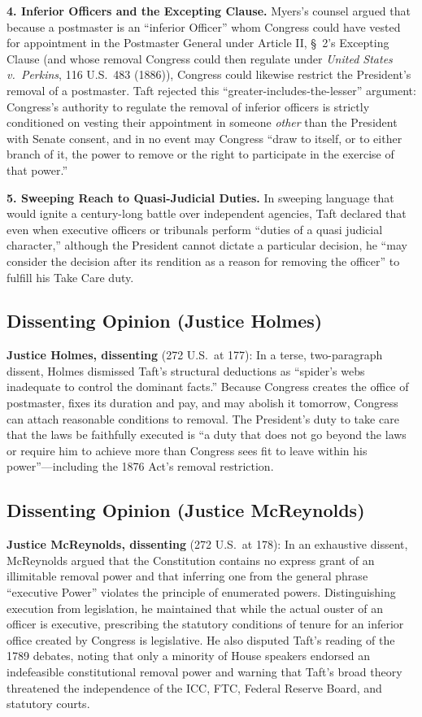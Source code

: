 \documentclass[12pt]{article}
\begin{document}
\textbf{4. Inferior Officers and the Excepting Clause.}
Myers's counsel argued that because a postmaster is an ``inferior Officer'' whom Congress could have vested for appointment in the Postmaster General under Article II, \S~2's Excepting Clause (and whose removal Congress could then regulate under \textit{United States v.\ Perkins}, 116 U.S.\ 483 (1886)), Congress could likewise restrict the President's removal of a postmaster. Taft rejected this ``greater-includes-the-lesser'' argument: Congress's authority to regulate the removal of inferior officers is strictly conditioned on vesting their appointment in someone \emph{other} than the President with Senate consent, and in no event may Congress ``draw to itself, or to either branch of it, the power to remove or the right to participate in the exercise of that power.''

\textbf{5. Sweeping Reach to Quasi-Judicial Duties.}
In sweeping language that would ignite a century-long battle over independent agencies, Taft declared that even when executive officers or tribunals perform ``duties of a quasi judicial character,'' although the President cannot dictate a particular decision, he ``may consider the decision after its rendition as a reason for removing the officer'' to fulfill his Take Care duty.

\subsection{Dissenting Opinion (Justice Holmes)}

\textbf{Justice Holmes, dissenting} (272 U.S.\ at 177): In a terse, two-paragraph dissent, Holmes dismissed Taft's structural deductions as ``spider's webs inadequate to control the dominant facts.'' Because Congress creates the office of postmaster, fixes its duration and pay, and may abolish it tomorrow, Congress can attach reasonable conditions to removal. The President's duty to take care that the laws be faithfully executed is ``a duty that does not go beyond the laws or require him to achieve more than Congress sees fit to leave within his power''---including the 1876 Act's removal restriction.

\subsection{Dissenting Opinion (Justice McReynolds)}

\textbf{Justice McReynolds, dissenting} (272 U.S.\ at 178): In an exhaustive dissent, McReynolds argued that the Constitution contains no express grant of an illimitable removal power and that inferring one from the general phrase ``executive Power'' violates the principle of enumerated powers. Distinguishing execution from legislation, he maintained that while the actual ouster of an officer is executive, prescribing the statutory conditions of tenure for an inferior office created by Congress is legislative. He also disputed Taft's reading of the 1789 debates, noting that only a minority of House speakers endorsed an indefeasible constitutional removal power and warning that Taft's broad theory threatened the independence of the ICC, FTC, Federal Reserve Board, and statutory courts.
\end{document}
